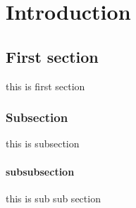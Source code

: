 \documentclass{report}
\begin{document}
\chapter{Introduction}

\section{First section}

this is first section

\subsection{Subsection}
this is subsection
\subsubsection{subsubsection}


this is sub sub section
\end{document}
